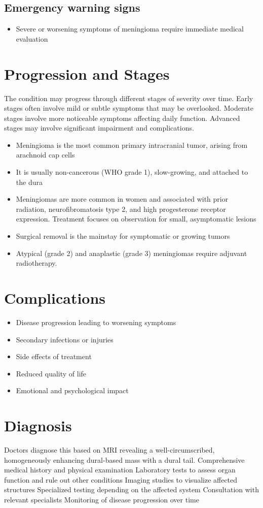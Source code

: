 \subsection{Emergency warning signs}
\begin{itemize}[noitemsep]
  \item Severe or worsening symptoms of meningioma require immediate medical evaluation
\end{itemize}
\section{Progression and Stages}
The condition may progress through different stages of severity over time. Early stages often involve mild or subtle symptoms that may be overlooked. Moderate stages involve more noticeable symptoms affecting daily function. Advanced stages may involve significant impairment and complications.

\begin{itemize}[noitemsep]
  \item Meningioma is the most common primary intracranial tumor, arising from arachnoid cap cells
  \item It is usually non-cancerous (WHO grade 1), slow-growing, and attached to the dura
  \item Meningiomas are more common in women and associated with prior radiation, neurofibromatosis type 2, and high progesterone receptor expression. Treatment focuses on observation for small, asymptomatic lesions
  \item Surgical removal is the mainstay for symptomatic or growing tumors
  \item Atypical (grade 2) and anaplastic (grade 3) meningiomas require adjuvant radiotherapy.
\end{itemize}
\section{Complications}
\begin{itemize}[noitemsep]
  \item Disease progression leading to worsening symptoms
  \item Secondary infections or injuries
  \item Side effects of treatment
  \item Reduced quality of life
  \item Emotional and psychological impact
\end{itemize}
\section{Diagnosis}
Doctors diagnose this based on MRI revealing a well-circumscribed, homogeneously enhancing dural-based mass with a dural tail. Comprehensive medical history and physical examination Laboratory tests to assess organ function and rule out other conditions Imaging studies to visualize affected structures Specialized testing depending on the affected system Consultation with relevant specialists Monitoring of disease progression over time

